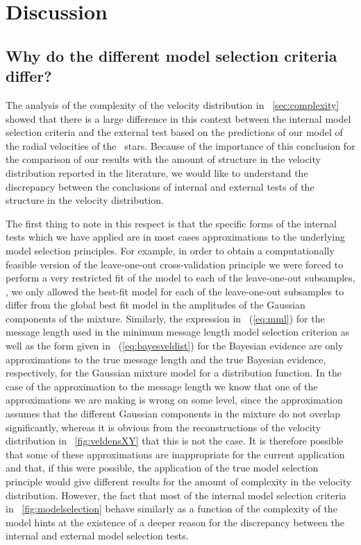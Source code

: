 \section{Discussion}

\subsection{Why do the different model selection criteria differ?}

The analysis of the complexity of the velocity distribution in
\sectionname~\ref{sec:complexity} showed that there is a large
difference in this context between the internal model selection
criteria and the external test based on the predictions of our model
of the radial velocities of the \gcsabb\ stars. Because of the
importance of this conclusion for the comparison of our results with
the amount of structure in the velocity distribution reported in the
literature, we would like to understand the discrepancy between the
conclusions of internal and external tests of the structure in the
velocity distribution.

The first thing to note in this respect is that the specific forms of
the internal tests which we have applied are in most cases
approximations to the underlying model selection principles. For
example, in order to obtain a computationally feasible version of the
leave-one-out cross-validation principle we were forced to perform a
very restricted fit of the model to each of the leave-one-out
subsamples, \ie, we only allowed the best-fit model for each of the
leave-one-out subsamples to differ from the global best fit model in
the amplitudes of the Gaussian components of the mixture. Similarly,
the expression in \eqnnumber~(\ref{eq:mml}) for the message length
used in the minimum message length model selection criterion as well
as the form given in \eqnnumber~(\ref{eq:bayesveldist}) for the Bayesian
evidence are only approximations to the true message length and the
true Bayesian evidence, respectively, for the Gaussian mixture model
for a distribution function. In the case of the approximation to the
message length we know that one of the approximations we are making is
wrong on some level, since the approximation assumes that the
different Gaussian components in the mixture do not overlap
significantly, whereas it is obvious from the reconstructions of the
velocity distribution in \figurename~\ref{fig:veldensXY} that this is
not the case. It is therefore possible that some of these
approximations are inappropriate for the current application and that,
if this were possible, the application of the true model selection
principle would give different results for the amount of complexity in
the velocity distribution. However, the fact that most of the internal
model selection criteria in \figurename~\ref{fig:modelselection}
behave similarly as a function of the complexity of the model hints at
the existence of a deeper reason for the discrepancy between the
internal and external model selection tests.

